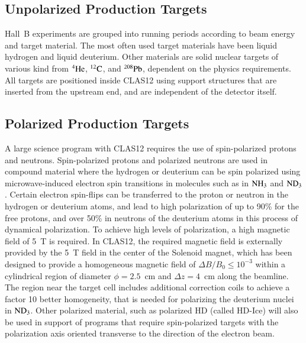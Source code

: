 \documentclass[final,3p,twocolumn]{elsarticle}
\begin{document}
\subsection{Unpolarized Production Targets} 

Hall~B experiments are grouped into running periods according to beam energy and target material. The most often
used target materials have been liquid hydrogen and liquid deuterium. Other materials are solid nuclear targets of
various kind from $\rm ^4He$, $\rm ^{12}C$, and $\rm ^{208}Pb$, dependent on the physics requirements. All targets
are positioned inside CLAS12 using support structures that are inserted from the upstream end, and are independent 
of the detector itself. 

 \subsection{Polarized Production Targets} 

A large science program with CLAS12 requires the use of spin-polarized protons and neutrons. 
Spin-polarized protons and polarized neutrons are used in compound material where the hydrogen or 
deuterium can be spin polarized using microwave-induced electron spin transitions in molecules such as 
in $\rm NH_3$ and $\rm ND_3$. Certain electron spin-flips can be transferred to the proton or neutron in the 
hydrogen or deuterium atoms, and lead to high polarization of up to 90\% for the free protons, and 
over 50\% in neutrons of the deuterium atoms in this process of dynamical polarization. To achieve 
high levels of polarization, a high magnetic field of 5~T is required. In CLAS12, the required magnetic 
field is externally 
provided by the 5~T field in the center of the Solenoid magnet, which has been designed to provide 
a homogeneous magnetic field of $\Delta B / B_0 \leq 10^{-3}$ within a cylindrical region of diameter 
$\phi = 2.5$~cm and $\Delta{z} = 4$~cm along the beamline.  The region near the target cell includes 
additional correction coils to achieve a factor 10 better homogeneity, that is needed for polarizing 
the deuterium nuclei in $\rm ND_3$. Other polarized material, such as polarized HD (called HD-Ice)  
will also be used in support of programs that require spin-polarized targets with the polarization axis 
oriented transverse to the direction of the electron beam.        
\end{document}
